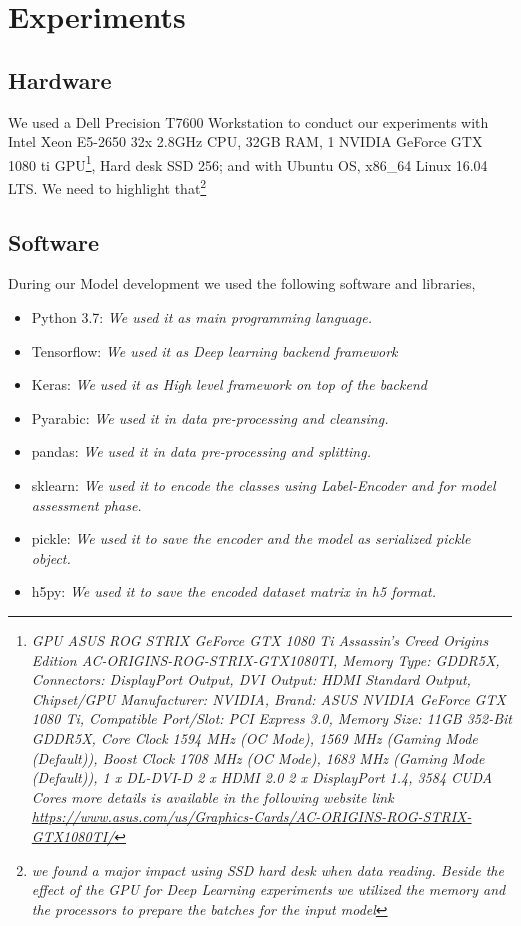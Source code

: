 \clearpage

\section{Experiments}

\subsection{Hardware}

We used a Dell Precision T7600 Workstation to conduct our experiments with Intel Xeon E5-2650 32x 2.8GHz CPU, 32GB RAM, 1 NVIDIA GeForce GTX 1080 ti GPU\footnote{\textit{GPU ASUS ROG STRIX GeForce GTX 1080 Ti Assassin's Creed Origins Edition AC-ORIGINS-ROG-STRIX-GTX1080TI, Memory Type: GDDR5X, Connectors: DisplayPort Output, DVI Output: HDMI Standard Output, Chipset/GPU Manufacturer: NVIDIA, Brand: ASUS NVIDIA GeForce GTX 1080 Ti, Compatible Port/Slot: PCI Express 3.0, Memory Size: 11GB 352-Bit GDDR5X, Core Clock 1594 MHz (OC Mode), 1569 MHz (Gaming Mode (Default)), Boost Clock 1708 MHz (OC Mode), 1683 MHz (Gaming Mode (Default)), 1 x DL-DVI-D 2 x HDMI 2.0 2 x DisplayPort 1.4, 3584 CUDA Cores more details is available in the following website link \url{https://www.asus.com/us/Graphics-Cards/AC-ORIGINS-ROG-STRIX-GTX1080TI/}} }, Hard desk SSD 256; and with Ubuntu OS, x86\_64 Linux 16.04 LTS. We need to highlight that\footnote{\textit{we found a major impact using SSD hard desk when data reading. Beside the effect of the GPU for Deep Learning experiments we utilized the memory and the processors to prepare the batches for the input model}}


\subsection{Software}

During our Model development we used the following software and libraries,

\begin{itemize}
  \item Python 3.7: \textit{We used it as main programming language.}
  \item Tensorflow: \textit{We used it as Deep learning backend framework}
  \item Keras: \textit{We used it as High level framework on top of the backend}
  \item Pyarabic: \textit{We used it in data pre-processing and cleansing.}
  \item pandas: \textit{We used it in data pre-processing and splitting.}
  \item sklearn: \textit{We used it to encode the classes using Label-Encoder and for model assessment phase.}
  \item pickle: \textit{We used it to save the encoder and the model as serialized pickle object.}
  \item h5py: \textit{We used it to save the encoded dataset matrix in h5 format.}
\end{itemize}

